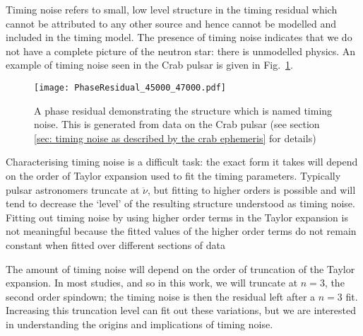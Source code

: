 Timing noise refers to small, low level structure in the timing residual which
cannot be attributed to any other source and hence cannot be modelled and included
in the timing model. The presence of timing noise indicates that we do not
have a complete picture of the neutron star: there is unmodelled physics.
An example of timing noise seen in the Crab pulsar is given in
Fig.~\ref{fig: timing noise example}.

\begin{figure}[htb] 
    \centering
    \texttt{[image: PhaseResidual\_45000\_47000.pdf]}
    \caption{A phase residual demonstrating the structure which is named timing
        noise. This is generated from data on the Crab pulsar (see section
    \ref{sec: timing noise as described by the crab ephemeris} for details)}
    \label{fig: timing noise example}
\end{figure} 

Characterising timing noise is a difficult task: the exact form it takes will
depend on the order of Taylor expansion used to fit the timing parameters. Typically
pulsar astronomers truncate at $\ddot{\nu}$, but fitting to higher orders is
possible and will tend to decrease the `level' of the resulting structure
understood as timing noise. Fitting out timing noise by using higher order terms
in the Taylor expansion is not meaningful because the fitted values of the 
higher order terms do not remain constant when fitted over different sections of
data

The amount of timing noise will depend on the
order of truncation of the Taylor expansion.  In most studies, and so in this
work, we will truncate at $n=3$, the second order spindown; the timing noise is
then the residual left after a $n=3$ fit. Increasing this truncation level can
fit out these variations, but we are interested in understanding the origins
and implications of timing noise.

